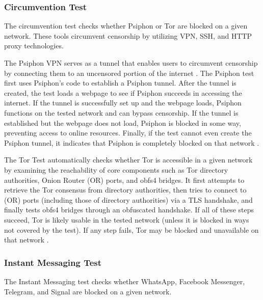 \subsubsection{Circumvention Test}

The circumvention test checks whether Psiphon or Tor are blocked on a given network. These tools circumvent censorship by utilizing VPN, SSH, and HTTP proxy technologies. 

The Psiphon VPN serves as a tunnel that enables users to circumvent censorship by connecting them to an uncensored portion of the internet \cite{ooniPsiphonTest}. The Psiphon test first uses Psiphon’s code to establish a Psiphon tunnel. After the tunnel is created, the test loads a webpage to see if Psiphon succeeds in accessing the internet. If the tunnel is successfully set up and the webpage loads, Psiphon functions on the tested network and can bypass censorship. If the tunnel is established but the webpage does not load, Psiphon is blocked in some way, preventing access to online resources. Finally, if the test cannot even create the Psiphon tunnel, it indicates that Psiphon is completely blocked on that network \cite{PsiphonTestGitHub}.

The Tor Test \cite{TorTestABOUTOONI} automatically checks whether Tor is accessible in a given network by examining the reachability of core components such as Tor directory authorities, Onion Router (OR) ports, and obfs4 bridges. It first attempts to retrieve the Tor consensus from directory authorities, then tries to connect to (OR) ports (including those of directory authorities) via a TLS handshake, and finally tests obfs4 bridges through an obfuscated handshake. If all of these steps succeed, Tor is likely usable in the tested network (unless it is blocked in ways not covered by the test). If any step fails, Tor may be blocked and unavailable on that network \cite{TorTestGitHub}.


\subsubsection{Instant Messaging Test}

The Instant Messaging test checks whether WhatsApp, Facebook Messenger, Telegram, and Signal are blocked on a given network.

